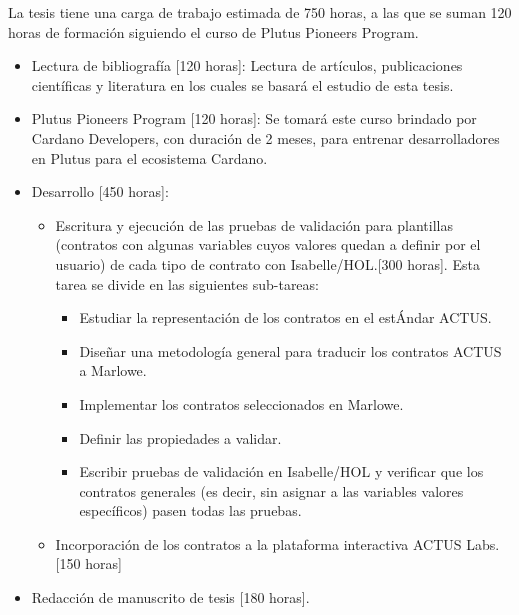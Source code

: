 \documentclass[12pt]{book}
\begin{document}
La tesis tiene una carga de trabajo estimada de 750 horas, a las que se suman 120 horas de formación siguiendo el curso de Plutus Pioneers Program.

\begin{itemize}
    \item Lectura de bibliografía [120 horas]: Lectura de artículos, publicaciones científicas y literatura en los cuales se basará el estudio de esta tesis.
    \item Plutus Pioneers Program [120 horas]: Se tomará este curso brindado por Cardano Developers, con duración de 2 meses, para entrenar desarrolladores en Plutus para el ecosistema Cardano.
    \item Desarrollo [450 horas]: 
    \begin{itemize}
    \item Escritura y ejecución de las pruebas de validación para plantillas (contratos con algunas variables cuyos valores quedan a definir por el usuario) de cada tipo de contrato con Isabelle/HOL.\@[300 horas]. Esta tarea se divide en las siguientes sub-tareas:
    \begin{itemize}
    \item Estudiar la representación de los contratos en el estÁndar ACTUS.\@
    \item Diseñar una metodología general para traducir los contratos ACTUS a Marlowe.
    \item Implementar los contratos seleccionados en Marlowe.
    \item Definir las propiedades a validar.
    \item Escribir pruebas de validación en Isabelle/HOL y verificar que los contratos generales (es decir, sin asignar a las variables valores específicos) pasen todas las pruebas. 
    \end{itemize}
    
    \item Incorporación de los contratos a la plataforma interactiva ACTUS Labs. [150 horas]
    \end{itemize}
\item Redacción de manuscrito de tesis [180 horas].%

\end{itemize}

\bigskip





\end{document}
